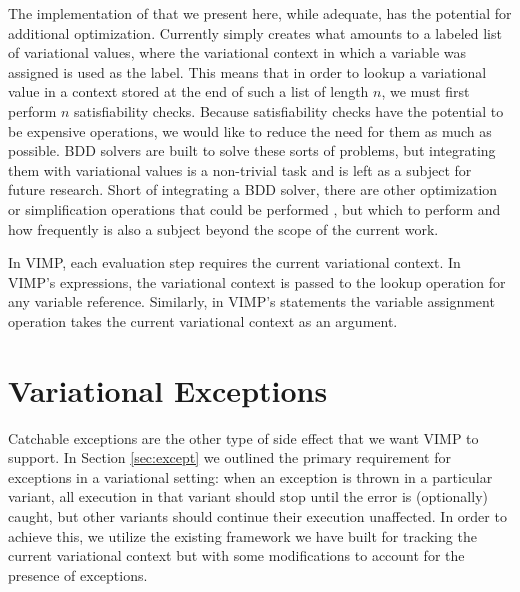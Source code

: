 \documentclass[12pt,oneside]{book}
\begin{document}
The implementation of  that we present here, while adequate, has the potential for additional optimization. Currently  simply creates what amounts to a labeled list of variational values, where the variational context in which a variable was assigned is used as the label.
This means that in order to lookup a variational value in a context stored at the end of such a list of length $n$, we must first perform $n$ satisfiability checks.
Because satisfiability checks have the potential to be expensive operations, we would like to reduce the need for them as much as possible.
BDD solvers are built to solve these sorts of problems, but integrating them with variational values is a non-trivial task and is left as a subject for future research.
Short of integrating a BDD solver, there are other optimization or simplification operations that could be performed \cite{Walk13thesis,HW16fosd}, but which to perform and how frequently
is also a subject beyond the scope of the current work.

In VIMP, each evaluation step requires the current variational context. In VIMP's expressions, the variational context is passed to the lookup operation for any
variable reference. Similarly, in VIMP's statements the variable assignment operation takes the current variational context as an argument.

\section{Variational Exceptions}
\label{sec:varexcept}

Catchable exceptions are the other type of side effect that we want VIMP to support. In Section \ref{sec:except} we outlined the primary requirement for exceptions
in a variational setting: when an exception is thrown in a particular variant, all execution in that variant should stop until the error is (optionally) caught, but other variants
should continue their execution unaffected. In order to achieve this, we utilize the existing framework we have built for tracking the current variational context but with some
modifications to account for the presence of exceptions.
\end{document}

